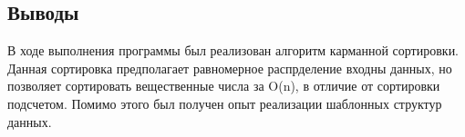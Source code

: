 \documentclass[12pt]{article}
\begin{document}
\subsection*{Выводы}

В ходе выполнения программы был реализован алгоритм карманной сортировки. Данная сортировка предполагает равномерное распрделение
входны данных, но позволяет сортировать вещественные числа за O(n), в отличие от сортировки подсчетом.
Помимо этого был получен опыт реализации шаблонных структур данных.
\end{document}
